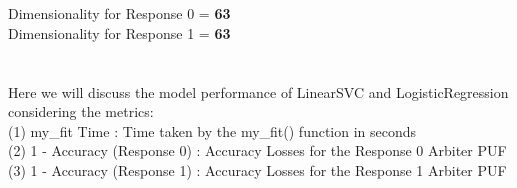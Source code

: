 \documentclass{article}
\begin{document}
\section{}
Dimensionality for Response 0 = \textbf{63}\\
Dimensionality for Response 1 = \textbf{63}\\
\setcounter{section}{5}
\section{}


Here we will discuss the model performance of LinearSVC and LogisticRegression considering the metrics:\\
(1) my\_fit Time : Time taken by the my\_fit() function in seconds\\
(2) 1 - Accuracy (Response 0) : Accuracy Losses for the Response 0 Arbiter PUF\\
(3) 1 - Accuracy (Response 1) : Accuracy Losses for the Response 1 Arbiter PUF
\end{document}
